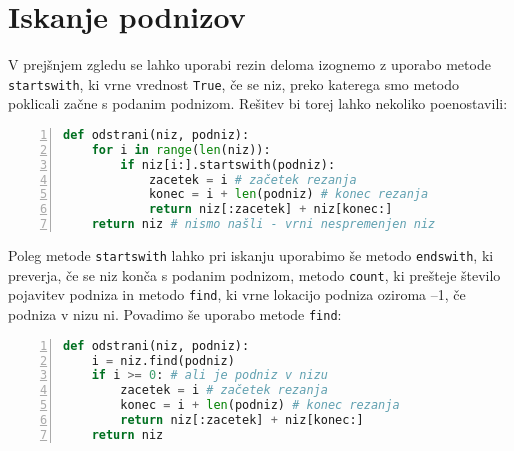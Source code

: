 \section{Iskanje podnizov}
V prejšnjem zgledu se lahko uporabi rezin deloma izognemo z uporabo metode \texttt{startswith}, ki vrne vrednost \texttt{True}, če se niz, preko katerega smo metodo poklicali začne s podanim podnizom. Rešitev bi torej lahko nekoliko poenostavili:
\begin{lstlisting}[language=Python,numbers=left]
def odstrani(niz, podniz):
    for i in range(len(niz)):
        if niz[i:].startswith(podniz):
            zacetek = i # začetek rezanja
            konec = i + len(podniz) # konec rezanja
            return niz[:zacetek] + niz[konec:]
    return niz # nismo našli - vrni nespremenjen niz
\end{lstlisting}
Poleg metode \texttt{startswith} lahko pri iskanju uporabimo še metodo \texttt{endswith}, ki preverja, če se niz konča s podanim podnizom, metodo \texttt{count}, ki prešteje število pojavitev podniza in metodo \texttt{find}, ki vrne lokacijo podniza oziroma --1, če podniza v nizu ni. Povadimo še uporabo metode \texttt{find}:
\begin{lstlisting}[language=Python,numbers=left]
def odstrani(niz, podniz):
    i = niz.find(podniz)
    if i >= 0: # ali je podniz v nizu
        zacetek = i # začetek rezanja
        konec = i + len(podniz) # konec rezanja
        return niz[:zacetek] + niz[konec:]
    return niz
\end{lstlisting}

